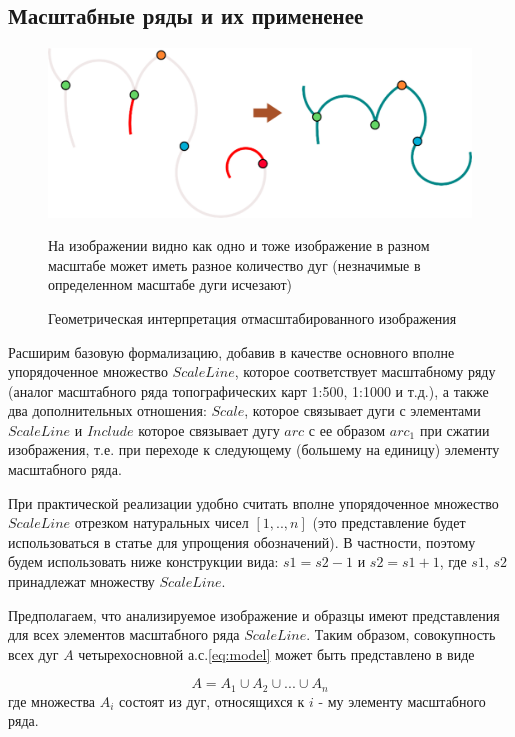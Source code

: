 \subsection{Масштабные ряды и их примененее}

\begin{figure}[h]
\centering
\includegraphics[width=0.85\linewidth,keepaspectratio]{images/scaleline}
\caption{Геометрическая интерпретация отмасштабированного изображения}
\medskip
\small
На изображении видно как одно и тоже изображение в разном масштабе может иметь разное количество дуг (незначимые в определенном масштабе дуги исчезают)
\end{figure}


Расширим базовую формализацию, добавив в качестве основного вполне упорядоченное множество $ScaleLine$, которое соответствует масштабному ряду (аналог масштабного ряда топографических карт 1:500,  1:1000 и т.д.), а также два дополнительных отношения: $Scale$,  которое связывает дуги с элементами $ScaleLine$ и $Include$ которое связывает дугу $arc$ с ее образом $arc_1$ при сжатии изображения, т.е. при переходе к следующему (большему на единицу) элементу масштабного ряда.

При практической реализации удобно считать  вполне упорядоченное множество $ScaleLine$ отрезком натуральных чисел $[1,.., n]$ (это представление будет использоваться в статье для упрощения обозначений). В частности, поэтому будем использовать ниже конструкции вида: $s1  = s2 - 1$ и $s2  = s1 + 1$, где $s1$, $s2$  принадлежат  множеству $ScaleLine$.

Предполагаем,  что анализируемое изображение и образцы имеют представления для всех элементов масштабного ряда $ScaleLine$. Таким образом, совокупность всех дуг $A$ четырехосновной а.с.\ref{eq:model} может быть представлено в виде



\begin{equation}
A = A_1 \cup A_2 \cup ... \cup A_n
\label{eq:components_set}
\end{equation}
где  множества $A_i$ состоят из дуг, относящихся к $i$ - му элементу масштабного ряда. 

